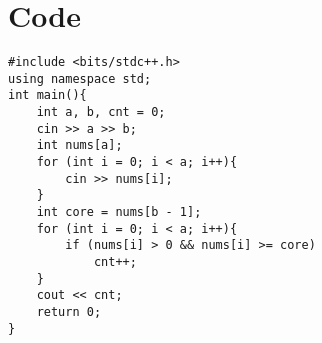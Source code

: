 \documentclass{article}
\begin{document}

\newpage
\section{Code}

\begin{lstlisting}
#include <bits/stdc++.h>
using namespace std;
int main(){
    int a, b, cnt = 0;
    cin >> a >> b;
    int nums[a];
    for (int i = 0; i < a; i++){
        cin >> nums[i];
    }
    int core = nums[b - 1];
    for (int i = 0; i < a; i++){
        if (nums[i] > 0 && nums[i] >= core)
            cnt++;
    }
    cout << cnt;
    return 0;
}
\end{lstlisting}
\end{document}
